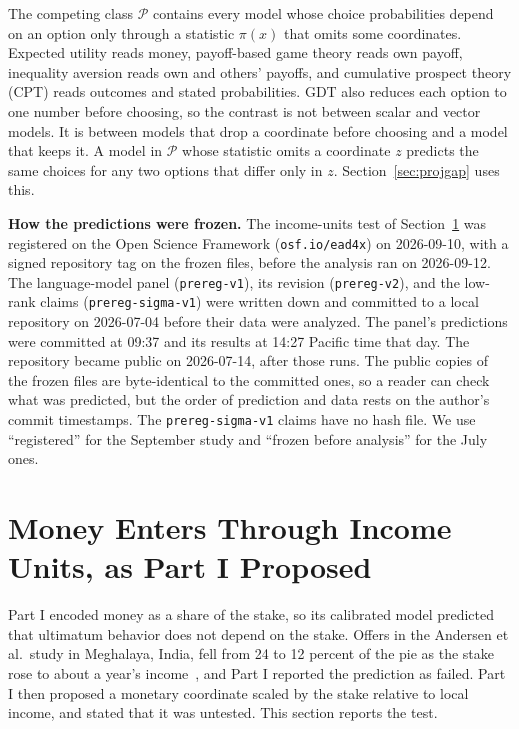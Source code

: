 \documentclass[journal]{IEEEtran}
\newcommand{\Pclass}{\mathcal{P}}          %
\begin{document}
The competing class $\Pclass$ contains every model whose choice probabilities depend on an option only through a statistic $\pi(x)$ that omits some coordinates.
Expected utility reads money, payoff-based game theory reads own payoff, inequality aversion reads own and others' payoffs, and cumulative prospect theory (CPT) reads outcomes and stated probabilities.
GDT also reduces each option to one number before choosing, so the contrast is not between scalar and vector models.
It is between models that drop a coordinate before choosing and a model that keeps it.
A model in $\Pclass$ whose statistic omits a coordinate $z$ predicts the same choices for any two options that differ only in $z$.
Section~\ref{sec:projgap} uses this.

\textbf{How the predictions were frozen.}
The income-units test of Section~\ref{sec:income} was registered on the Open Science Framework (\texttt{osf.io/ead4x}) on 2026-09-10, with a signed repository tag on the frozen files, before the analysis ran on 2026-09-12.
The language-model panel (\texttt{prereg-v1}), its revision (\texttt{prereg-v2}), and the low-rank claims (\texttt{prereg-sigma-v1}) were written down and committed to a local repository on 2026-07-04 before their data were analyzed.
The panel's predictions were committed at 09:37 and its results at 14:27 Pacific time that day.
The repository became public on 2026-07-14, after those runs.
The public copies of the frozen files are byte-identical to the committed ones, so a reader can check what was predicted, but the order of prediction and data rests on the author's commit timestamps.
The \texttt{prereg-sigma-v1} claims have no hash file.
We use ``registered'' for the September study and ``frozen before analysis'' for the July ones.

\section{Money Enters Through Income Units, as Part I Proposed}
\label{sec:income}

Part I encoded money as a share of the stake, so its calibrated model predicted that ultimatum behavior does not depend on the stake.
Offers in the Andersen et al.\ study in Meghalaya, India, fell from 24 to 12 percent of the pie as the stake rose to about a year's income~\cite{andersen2011}, and Part I reported the prediction as failed.
Part I then proposed a monetary coordinate scaled by the stake relative to local income, and stated that it was untested.
This section reports the test.
\end{document}

